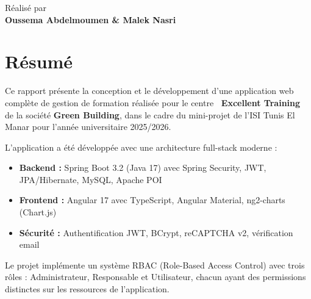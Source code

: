 \documentclass[12pt,a4paper]{report}
\begin{document}
\begin{titlepage}
\vspace{1.2cm}
{\large\color{gray} R\'{e}alis\'{e} par}\\[0.3cm]
{\Large\bfseries\color{white} Oussema Abdelmoumen \quad \& \quad Malek Nasri}

\vfill
{}
\end{titlepage}
\pagecolor{white}\color{black}

\tableofcontents
\clearpage

\chapter*{R\'{e}sum\'{e}}

Ce rapport pr\'{e}sente la conception et le d\'{e}veloppement d'une application web compl\`{e}te de gestion de formation r\'{e}alis\'{e}e pour le centre \textbf{\og ~Excellent Training~\fg{}} de la soci\'{e}t\'{e} \textbf{Green Building}, dans le cadre du mini-projet de l'ISI Tunis El Manar pour l'ann\'{e}e universitaire 2025/2026.

L'application a \'{e}t\'{e} d\'{e}velopp\'{e}e avec une architecture full-stack moderne :
\begin{itemize}
  \item \textbf{Backend :} Spring Boot 3.2 (Java 17) avec Spring Security, JWT, JPA/Hibernate, MySQL, Apache POI
  \item \textbf{Frontend :} Angular 17 avec TypeScript, Angular Material, ng2-charts (Chart.js)
  \item \textbf{S\'{e}curit\'{e} :} Authentification JWT, BCrypt, reCAPTCHA v2, v\'{e}rification email
\end{itemize}

\noindent Le projet impl\'{e}mente un syst\`{e}me RBAC (Role-Based Access Control) avec trois r\^{o}les : Administrateur, Responsable et Utilisateur, chacun ayant des permissions distinctes sur les ressources de l'application.
\end{document}

